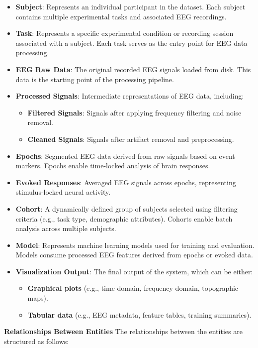 \begin{itemize}
    \item \textbf{Subject}: Represents an individual participant in the dataset. Each subject contains multiple experimental tasks and associated EEG recordings.
    \item \textbf{Task}: Represents a specific experimental condition or recording session associated with a subject. Each task serves as the entry point for EEG data processing.
    \item \textbf{EEG Raw Data}: The original recorded EEG signals loaded from disk. This data is the starting point of the processing pipeline.
    \item \textbf{Processed Signals}: Intermediate representations of EEG data, including:
    \begin{itemize}
        \item \textbf{Filtered Signals}: Signals after applying frequency filtering and noise removal.
        \item \textbf{Cleaned Signals}: Signals after artifact removal and preprocessing.
    \end{itemize}
    \item \textbf{Epochs}: Segmented EEG data derived from raw signals based on event markers. Epochs enable time-locked analysis of brain responses.
    \item \textbf{Evoked Responses}: Averaged EEG signals across epochs, representing stimulus-locked neural activity.
    \item \textbf{Cohort}: A dynamically defined group of subjects selected using filtering criteria (e.g., task type, demographic attributes). Cohorts enable batch analysis across multiple subjects.
    \item \textbf{Model}: Represents machine learning models used for training and evaluation. Models consume processed EEG features derived from epochs or evoked data.
    \item \textbf{Visualization Output}: The final output of the system, which can be either:
    \begin{itemize}
        \item \textbf{Graphical plots} (e.g., time-domain, frequency-domain, topographic maps).
        \item \textbf{Tabular data} (e.g., EEG metadata, feature tables, training summaries).
    \end{itemize}
\end{itemize}

\noindent\textbf{Relationships Between Entities}
The relationships between the entities are structured as follows:

